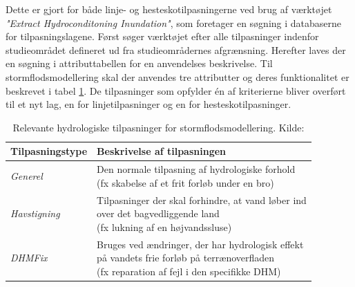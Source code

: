Dette er gjort for både linje- og hesteskotilpasningerne ved brug af værktøjet \textit{"Extract Hydroconditoning Inundation"}, som foretager en søgning i databaserne for tilpasningslagene. Først søger værktøjet efter alle tilpasninger indenfor studieområdet defineret ud fra studieområdernes afgrænsning. Herefter laves der en søgning i attributtabellen for en anvendelses beskrivelse. Til stormflodsmodellering skal der anvendes tre attributter og deres funktionalitet er beskrevet i tabel \ref{Tabel: Relevante hydrologiske tilpasninger}. De tilpasninger som opfylder én af kriterierne bliver overført til et nyt lag, en for linjetilpasninger og en for hesteskotilpasninger. 
\begin{table}[H]
\centering
\renewcommand{\arraystretch}{1.5}
\begin{threeparttable}
\caption{Relevante hydrologiske tilpasninger for stormflodsmodellering. Kilde: \cite{GeoDanmark_HydroLag}}
\label{Tabel: Relevante hydrologiske tilpasninger}
\begin{tabular}{@{} l l @{}} 
\toprule
\textbf{Tilpasningstype} & \textbf{Beskrivelse af tilpasningen} \\
\midrule
\textit{Generel} &
  \makecell[l]{Den normale tilpasning af hydrologiske forhold\\
  (fx skabelse af et frit forløb under en bro)} \\
\addlinespace
\textit{Havstigning} &
  \makecell[l]{Tilpasninger der skal forhindre, at vand løber ind\\
  over det bagvedliggende land\\
  (fx lukning af en højvandssluse)} \\
\addlinespace
\textit{DHMFix} &
  \makecell[l]{Bruges ved ændringer, der har hydrologisk effekt\\
  på vandets frie forløb på terrænoverfladen\\
  (fx reparation af fejl i den specifikke DHM)} \\
\bottomrule
\end{tabular}
\end{threeparttable}
\end{table}

